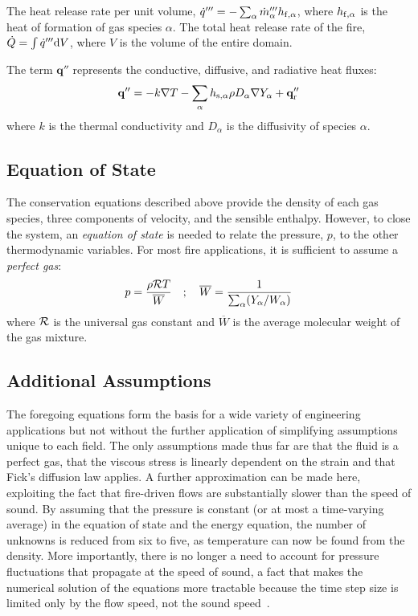 \documentclass[graybox]{svmult}
\begin{document}
The heat release rate per unit volume, $\dot{q}'''=-\sum_\alpha \dot{m}_\alpha''' h_{{\rm f},\alpha}$, where $h_{{\rm f},\alpha}$ is the heat of formation of gas species $\alpha$. The total heat release rate of the fire, $\dot{Q}=\int \dot{q}'''  {\rm d}V$, where $V$ is the volume of the entire domain.

The term $\mathbf{q}''$ represents the conductive, diffusive, and radiative heat fluxes:
\begin{equation}
   \mathbf{q}'' = -k \nabla T - \sum_\alpha h_{\rm s,\alpha}  \rho  D_\alpha \nabla Y_\alpha + \mathbf{q}_{\rm r}''  \label{bqdot_def}
\end{equation}
where $k$ is the thermal conductivity and $D_\alpha$ is the diffusivity of species $\alpha$.

\subsection{Equation of State}

The conservation equations described above provide the density of each gas species, three components of velocity, and the sensible enthalpy. However, to close the system, an {\em equation of state} is needed to relate the pressure, $p$, to the other thermodynamic variables. For most fire applications, it is sufficient to assume a {\em perfect gas}:
\begin{equation}
p = \frac{\rho {\cal R} T}{\overline{W}} \quad ; \quad \overline{W} = \frac{1}{\sum_\alpha (Y_\alpha / W_\alpha)}
\label{eq:pgas}
\end{equation}
where ${\cal R}$ is the universal gas constant and $\overline{W}$ is the average molecular weight of the gas mixture.


\subsection{Additional Assumptions}

The foregoing equations form the basis for a wide variety of engineering applications but not without the further application of simplifying assumptions unique to each field. The only assumptions made thus far are that the fluid is a perfect gas, that the viscous stress is linearly dependent on the strain and that Fick's diffusion law applies. A further approximation can be made here, exploiting the fact that fire-driven flows are substantially slower than the speed of sound. By assuming that the pressure is constant (or at most a time-varying average) in the equation of state and the energy equation, the number of unknowns is reduced from six to five, as temperature can now be found from the density. More importantly, there is no longer a need to account for pressure fluctuations that propagate at the speed of sound, a fact that makes the numerical solution of the equations more tractable because the time step size is limited only by the flow speed, not the sound speed~\cite{Rehm}.
\end{document}
